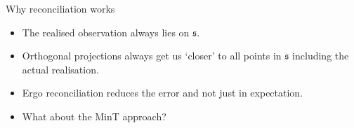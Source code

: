 \documentclass{beamer}
\begin{document}
%
%  	
  \begin{frame}{Why reconciliation works}
  \begin{itemize}
  	\item The realised observation always lies on $\mathfrak{s}$.
  	\item Orthogonal projections always get us `closer' to all points in $\mathfrak{s}$ including the actual realisation.
  	\item Ergo reconciliation reduces the error and not just in expectation. 
  	\pause
  	\item What about the MinT approach? 
  \end{itemize}
  \end{frame}
\end{document}
